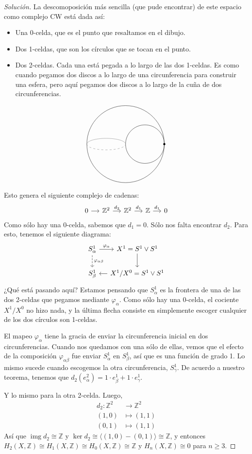 \documentclass[spanish]{book}
\theoremstyle{definition}
\newcommand{\Z}{\mathbb{Z}}
\DeclareMathOperator{\img}{img}
\begin{document}
	\begin{proof}[Solución]
	La descomoposición más sencilla (que pude encontrar) de este espacio como complejo CW está dada así:
		\begin{itemize}
		\item Una 0-celda, que es el punto que resaltamos en el dibujo.
		\item Dos 1-celdas, que son los círculos que se tocan en el punto.
		\item Dos 2-celdas. Cada una está pegada a lo largo de las dos 1-celdas. Es como cuando pegamos dos discos a lo largo de una circunferencia para construir una esfera, pero aquí pegamos dos discos a lo largo de la cuña de dos circunferencias.
	\end{itemize}
	\[\begin{tikzpicture}
		\draw (0,0) circle (2);
		
		\draw (1,0) circle (1);
		
		\draw[dashed,gray] (-2,0) arc (180:360:1 and 0.3);
		\draw[gray] (-2,0) arc (180:0:1 and 0.3);
		
		\filldraw (2,0) circle (0.05);
	\end{tikzpicture}\]
	Esto genera el siguiente complejo de cadenas:
	\[\begin{tikzcd}[column sep=small]
		0\arrow[r]&\Z^2\arrow[r,"d_2"]&\Z^2\arrow[r,"d_1"]&\Z\arrow[r,"d_1"]&0
	\end{tikzcd}\]
	Como sólo hay una 0-celda, sabemos que $d_1=0$. Sólo nos falta encontrar $d_2$. Para esto, tenemos el siguiente diagrama:
	\[\begin{tikzcd}[column sep=small]
		S^1_\alpha\arrow[r,"\varphi_\alpha"]\arrow[d,dashed,"\varphi_{\alpha\beta}"]&X^1=S^1\vee S^1\arrow[d]\\
		S^1_\beta&X^1/X^0=S^1\vee S^1\arrow[l]
	\end{tikzcd}\]
	¿Qué está pasando aquí? Estamos pensando que $S^1_\alpha$ es la frontera de una de las dos 2-celdas que pegamos mediante $\varphi_\alpha$. Como sólo hay una 0-celda, el cociente $X^1/X^0$ no hizo nada, y la última flecha consiste en simplemente escoger cualquier de los dos círculos son 1-celdas.
	
	El mapeo $\varphi_\alpha$ tiene la gracia de enviar la circunferencia inicial en dos circunferencias. Cuando nos quedamos con una sólo de ellas, vemos que el efecto de la composición $\varphi_{\alpha\beta}$ fue enviar $S^1_\alpha$ en $S^1_\beta$, así que es una función de grado 1. Lo mismo sucede cuando escogemos la otra circunferencia, $S^1_\gamma$. De acuerdo a nuestro teorema, tenemos que $d_2(e^2_\alpha)=1\cdot e^1_\beta+1\cdot e^1_\gamma$.
	
	Y lo mismo para la otra 2-celda. Luego,
	\begin{align*}
		d_2:\Z^2&\to\Z^2\\
		(1,0)&\mapsto (1,1)\\
		(0,1)&\mapsto (1,1)
	\end{align*}
	Así que $\img d_2\cong\Z$ y $\ker d_2\cong\langle (1,0)-(0,1)\rangle\cong\Z$, y entonces $H_2(X,\Z)\cong H_1(X,\Z)\cong H_0(X,\Z)\cong\Z$ y $H_n(X,\Z)\cong0$ para $n\geq3$.
\end{proof}
\end{document}
